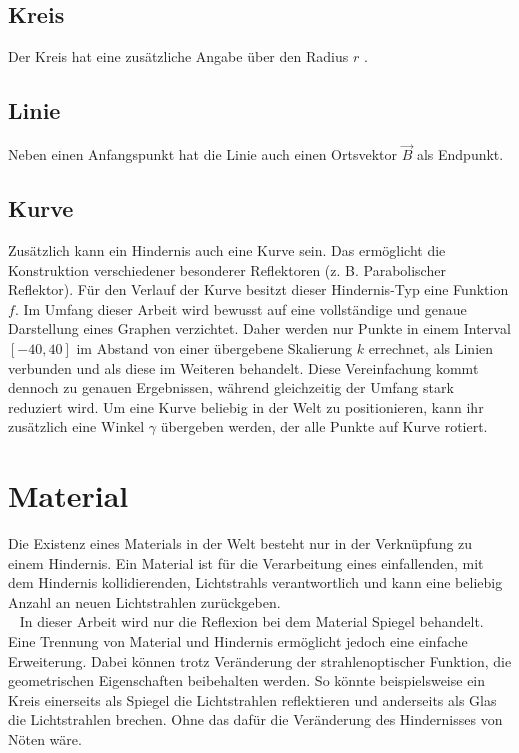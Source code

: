 \subsection{Kreis}
Der Kreis  hat eine zusätzliche Angabe über den Radius $ r $ .

\subsection{Linie}
Neben einen Anfangspunkt hat die Linie  auch einen Ortsvektor $ \vec{B} $ als Endpunkt. 

\subsection{Kurve}
Zusätzlich kann ein Hindernis auch eine Kurve  sein. 
Das ermöglicht die Konstruktion verschiedener besonderer Reflektoren (z. B. Parabolischer Reflektor).
Für den Verlauf der Kurve besitzt dieser Hindernis-Typ eine Funktion $ f $. 
Im Umfang dieser Arbeit wird bewusst auf eine vollständige und genaue Darstellung eines Graphen verzichtet. 
Daher werden nur Punkte in einem Interval $ [-40, 40] $ im Abstand von einer übergebene Skalierung $ k $  errechnet, 
als Linien verbunden und als diese im Weiteren behandelt. 
Diese Vereinfachung kommt dennoch zu genauen Ergebnissen, während gleichzeitig der Umfang stark reduziert wird.
Um eine Kurve beliebig in der Welt zu positionieren, kann ihr zusätzlich eine Winkel $ \gamma $  übergeben werden, 
der alle Punkte auf Kurve rotiert.


\section{Material}
\label{material}
Die Existenz eines Materials  in der Welt besteht nur in der Verknüpfung zu einem Hindernis. 
Ein Material ist für die Verarbeitung eines einfallenden, mit dem Hindernis kollidierenden, Lichtstrahls verantwortlich 
und kann eine beliebig Anzahl an neuen Lichtstrahlen zurückgeben. \\ 
In dieser Arbeit wird nur die Reflexion bei dem Material Spiegel  behandelt. 
Eine Trennung von Material und Hindernis ermöglicht jedoch eine einfache Erweiterung.
Dabei können trotz Veränderung der strahlenoptischer Funktion, die geometrischen Eigenschaften beibehalten werden.
So könnte beispielsweise ein Kreis einerseits als Spiegel die Lichtstrahlen reflektieren 
und anderseits als Glas die Lichtstrahlen brechen. Ohne das dafür die Veränderung des Hindernisses von Nöten wäre.